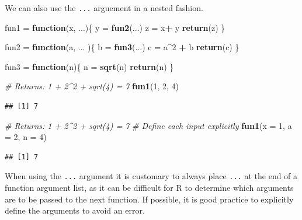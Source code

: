 \documentclass[
]{book}
\newenvironment{Shaded}{\begin{snugshade}}{\end{snugshade}}
\newcommand{\CommentTok}[1]{\textcolor[rgb]{0.56,0.35,0.01}{\textit{#1}}}
\newcommand{\ControlFlowTok}[1]{\textcolor[rgb]{0.13,0.29,0.53}{\textbf{#1}}}
\newcommand{\DataTypeTok}[1]{\textcolor[rgb]{0.13,0.29,0.53}{#1}}
\newcommand{\DecValTok}[1]{\textcolor[rgb]{0.00,0.00,0.81}{#1}}
\newcommand{\KeywordTok}[1]{\textcolor[rgb]{0.13,0.29,0.53}{\textbf{#1}}}
\newcommand{\NormalTok}[1]{#1}
\newcommand{\OperatorTok}[1]{\textcolor[rgb]{0.81,0.36,0.00}{\textbf{#1}}}
\newcommand{\StringTok}[1]{\textcolor[rgb]{0.31,0.60,0.02}{#1}}
\begin{document}
We can also use the \texttt{...} arguement in a nested fashion.

\begin{Shaded}
\begin{Highlighting}[]
\NormalTok{fun1 =}\StringTok{ }\ControlFlowTok{function}\NormalTok{(x, ...)\{}
\NormalTok{  y =}\StringTok{ }\KeywordTok{fun2}\NormalTok{(...)}
\NormalTok{  z =}\StringTok{ }\NormalTok{x}\OperatorTok{+}\StringTok{ }\NormalTok{y}
  \KeywordTok{return}\NormalTok{(z)}
\NormalTok{\}}

\NormalTok{fun2 =}\StringTok{ }\ControlFlowTok{function}\NormalTok{(a, ... )\{}
\NormalTok{  b =}\StringTok{ }\KeywordTok{fun3}\NormalTok{(...)}
\NormalTok{  c =}\StringTok{ }\NormalTok{a}\OperatorTok{^}\DecValTok{2} \OperatorTok{+}\StringTok{ }\NormalTok{b }
  \KeywordTok{return}\NormalTok{(c)}
\NormalTok{\}}

\NormalTok{fun3 =}\StringTok{ }\ControlFlowTok{function}\NormalTok{(n)\{}
\NormalTok{  n =}\StringTok{ }\KeywordTok{sqrt}\NormalTok{(n)}
  \KeywordTok{return}\NormalTok{(n)}
\NormalTok{\}}

\CommentTok{#  Returns:  1 + 2^2 + sqrt(4) = 7 }
\KeywordTok{fun1}\NormalTok{(}\DecValTok{1}\NormalTok{, }\DecValTok{2}\NormalTok{, }\DecValTok{4}\NormalTok{)}
\end{Highlighting}
\end{Shaded}

\begin{verbatim}
## [1] 7
\end{verbatim}

\begin{Shaded}
\begin{Highlighting}[]
\CommentTok{# Returns:  1 + 2^2 + sqrt(4) = 7 }
\CommentTok{# Define each input explicitly }
\KeywordTok{fun1}\NormalTok{(}\DataTypeTok{x =} \DecValTok{1}\NormalTok{, }\DataTypeTok{a =} \DecValTok{2}\NormalTok{, }\DataTypeTok{n =} \DecValTok{4}\NormalTok{)}
\end{Highlighting}
\end{Shaded}

\begin{verbatim}
## [1] 7
\end{verbatim}

When using the \texttt{...} argument it is customary to always place \texttt{...} at the end of a function argument list, as it can be difficult for R to determine which arguments are to be passed to the next function. If possible, it is good practice to explicitly define the arguments to avoid an error.
\end{document}
